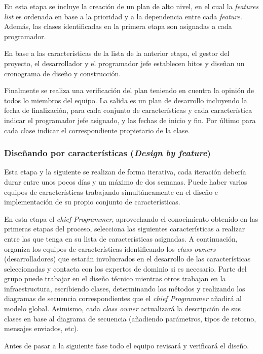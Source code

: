 \documentclass[11pt]{article}
\begin{document}
En esta etapa se incluye la creación de un plan de alto nivel, en el cual la \textit{features list} es ordenada en base a la
prioridad y a la dependencia entre cada \textit{feature}. Además, las clases identificadas en la primera etapa son
asignadas a cada programador.

En base a las características de la lista de la anterior etapa, el gestor del proyecto, el desarrollador y el programador jefe establecen hitos y diseñan un cronograma de diseño y construcción.


Finalmente se realiza una verificación del plan teniendo en cuentra la opinión de todos lo miembros del equipo. La salida es un plan de desarrollo incluyendo la fecha de finalización, para cada conjunto de características y cada característica indicar el programador jefe asignado, y las fechas de inicio y fin. Por último para cada clase indicar el correspondiente propietario de la clase.


\subsubsection{Diseñando por características (\textit{Design by feature})}
Esta etapa y la siguiente se realizan de forma iterativa, cada iteración debería durar entre unos pocos días y un máximo de dos semanas. Puede haber varios equipos de características trabajando simultáneamente en el diseño e implementación de su propio conjunto de características. 

En esta etapa el \textit{chief Programmer}, aprovechando el conocimiento obtenido en las primeras etapas del proceso, selecciona las siguientes características a realizar entre las que tenga en su lista de características asignadas. A continuación, organiza los equipos de características identificando los \textit{class owners} (desarrolladores) que estarán involucrados en el desarrollo de las características seleccionadas y contacta con los expertos de dominio si es necesario. Parte del grupo puede trabajar en el diseño técnico mientras otros trabajan en la infraestructura, escribiendo clases, determinando los métodos y realizando los diagramas de secuencia correspondientes que el \textit{chief Programmer} añadirá al modelo global. Asimismo, cada \textit{class owner} actualizará la descripción de sus clases en base al diagrama de secuencia (añadiendo parámetros, tipos de retorno, mensajes enviados, etc).

Antes de pasar a la siguiente fase todo el equipo revisará y verificará el diseño.
\end{document}
